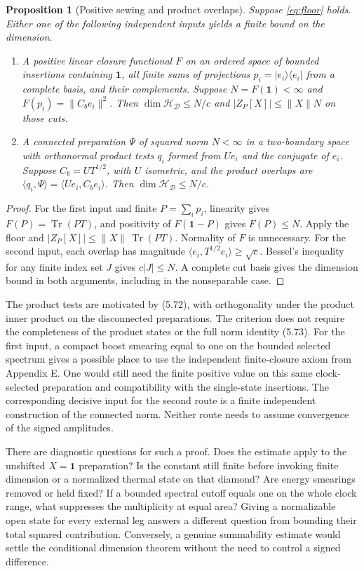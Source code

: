 \documentclass[11pt]{article}
\newcommand{\Tr}{\operatorname{Tr}}
\newcommand{\id}{\mathbf{1}}
\newcommand{\HH}{\mathcal H_{\mathcal D}}
\newtheorem{prop}{Proposition}
\begin{document}
\begin{prop}[Positive sewing and product overlaps]\label{prop:positive-sewing}
Suppose \eqref{eq:floor} holds. Either one of the following independent inputs yields a finite bound on the dimension.
\begin{enumerate}
 \item A positive linear closure functional $F$ on an ordered space of bounded insertions containing $\id$, all finite sums of projections $p_i=|e_i\rangle\langle e_i|$ from a complete basis, and their complements. Suppose $N=F(\id)<\infty$ and $F(p_i)=\|C_be_i\|^2$. Then $\dim\HH\le N/c$ and $|Z_P[X]|\le \|X\|N$ on those cuts.
 \item A connected preparation $\Psi$ of squared norm $N<\infty$ in a two-boundary space with orthonormal product tests $q_i$ formed from $Ue_i$ and the conjugate of $e_i$. Suppose $C_b=UT^{1/2}$, with $U$ isometric, and the product overlaps are $\langle q_i,\Psi\rangle=\langle Ue_i,C_be_i\rangle$. Then $\dim\HH\le N/c$.
\end{enumerate}
\end{prop}
\begin{proof}
For the first input and finite $P=\sum_i p_i$, linearity gives $F(P)=\Tr(PT)$, and positivity of $F(\id-P)$ gives $F(P)\le N$. Apply the floor and $|Z_P[X]|\le\|X\|\,\Tr(PT)$. Normality of $F$ is unnecessary. For the second input, each overlap has magnitude $\langle e_i,T^{1/2}e_i\rangle\ge\sqrt{c}$. Bessel's inequality for any finite index set $J$ gives $c|J|\le N$. A complete cut basis gives the dimension bound in both arguments, including in the nonseparable case.
\end{proof}
The product tests are motivated by (5.72), with orthogonality under the product inner product on the disconnected preparations. The criterion does not require the completeness of the product states or the full norm identity (5.73). For the first input, a compact boost smearing equal to one on the bounded selected spectrum gives a possible place to use the independent finite-closure axiom from Appendix E. One would still need the finite positive value on this same clock-selected preparation and compatibility with the single-state insertions. The corresponding decisive input for the second route is a finite independent construction of the connected norm. Neither route needs to assume convergence of the signed amplitudes.

There are diagnostic questions for such a proof. Does the estimate apply to the unshifted $X=\id$ prep\-aration? Is the constant still finite before invoking finite dimension or a normalized thermal state on that diamond? Are energy smearings removed or held fixed? If a bounded spectral cutoff equals one on the whole clock range, what suppresses the multiplicity at equal area? Giving a normalizable open state for every external leg answers a different question from bounding their total squared contribution. Conversely, a genuine summability estimate would settle the conditional dimension theorem without the need to control a signed difference.
\end{document}
